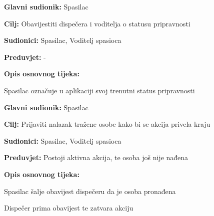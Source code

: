     	\noindent {}
    	\begin{packed_item}
    		
    		\item \textbf{Glavni sudionik: }Spasilac
    		\item  \textbf{Cilj:} Obavijestiti dispečera i voditelja o statusu pripravnosti
    		\item  \textbf{Sudionici:} Spasilac, Voditelj spasioca
    		\item  \textbf{Preduvjet:} -
    		\item  \textbf{Opis osnovnog tijeka:}
    		
    		\item[] \begin{packed_enum}
    			
    			\item Spasilac označuje u aplikaciji svoj trenutni status pripravnosti\\
    			
    		\end{packed_enum}
    	\end{packed_item}
    \noindent {}
    \begin{packed_item}
    	
    	\item \textbf{Glavni sudionik: }Spasilac
    	\item  \textbf{Cilj:} Prijaviti nalazak tražene osobe kako bi se akcija privela kraju
    	\item  \textbf{Sudionici:} Spasilac, Voditelj spasioca
    	\item  \textbf{Preduvjet:} Postoji aktivna akcija, te osoba još nije nađena
    	\item  \textbf{Opis osnovnog tijeka:}
    	
    	\item[] \begin{packed_enum}
    		
    		\item Spasilac šalje obavijest dispečeru da je osoba pronađena
    		\item Dispečer prima obavijest te zatvara akciju
    		
    	\end{packed_enum}
    \end{packed_item}
		\newpage
		\noindent {}
